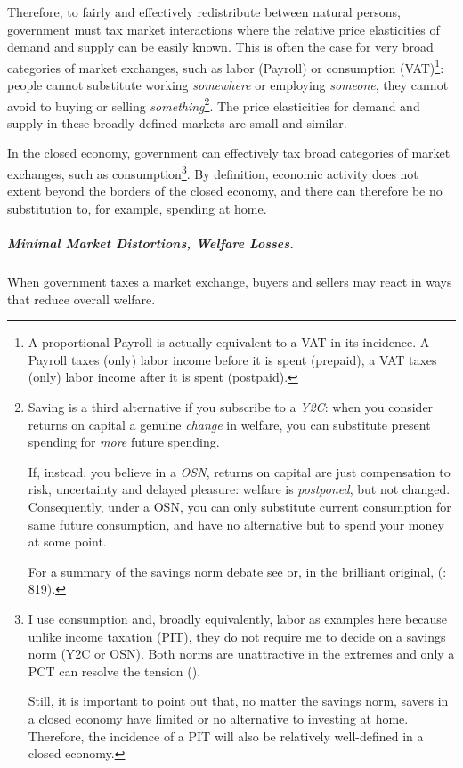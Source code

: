 Therefore, to fairly and effectively redistribute between natural persons, government must tax market interactions where the relative price elasticities of demand and supply can be easily known. This is often the case for very broad categories of market exchanges, such as labor (\gls{Payroll}) or consumption (\gls{VAT})\footnote{A proportional \gls{Payroll} is actually equivalent to a \gls{VAT} in its incidence. A \gls{Payroll} taxes (only) labor income before it is spent (prepaid), a \gls{VAT} taxes (only) labor income after it is spent (postpaid).}: people cannot substitute working \emph{somewhere} or employing \emph{someone}, they cannot avoid to buying or selling \emph{something}\footnote{
	Saving is a third alternative if you subscribe to a \emph{\gls{Y2C}}: when you consider returns on capital a genuine \emph{change} in welfare, you can substitute present spending for \emph{more} future spending. 
	
	If, instead, you believe in a \emph{\gls{OSN}}, returns on capital are just compensation to risk, uncertainty and delayed pleasure: welfare is \emph{postponed}, but not changed. Consequently, under a \gls{OSN}, you can only substitute current consumption for same future consumption, and have no alternative but to spend your money at some point. 
	
	For a summary of the savings norm debate see \cite{Held2010a} or, in the brilliant original, \citeauthor{McCaffery2005} (\citeyear{McCaffery2005}: 819).}. 
The price elasticities for demand and supply in these broadly defined markets are small and similar.

In the closed economy, government can effectively tax broad categories of market exchanges, such as consumption\footnote{
	I use consumption and, broadly equivalently, labor as examples here because unlike income taxation (\gls{PIT}), they do not require me to decide on a savings norm (\gls{Y2C} or \gls{OSN}). Both norms are unattractive in the extremes and only a \gls{PCT} can resolve the tension (\citealt{Held2010a}).
	
	Still, it is important to point out that, no matter the savings norm, savers in a closed economy have limited or no alternative to investing at home. Therefore, the incidence of a \gls{PIT} will also be relatively well-defined in a closed economy.}. 
By definition, economic activity does not extent beyond the borders of the closed economy, and there can therefore be no substitution to, for example, spending at home.

\subparagraph[Tax Efficiency]{Minimal Market Distortions, Welfare Losses.}  \label{sec:minimal_DWL}
When government taxes a market exchange, buyers and sellers may react in ways that reduce overall welfare. 

